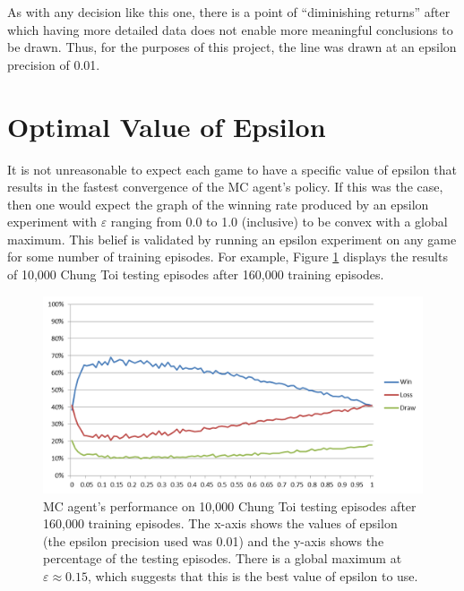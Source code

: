 \documentclass[11pt,a4paper,twoside,openright]{report}
\begin{document}
As with any decision like this one, there is a point of ``diminishing returns'' after which having more detailed data does not enable more meaningful conclusions to be drawn. Thus, for the purposes of this project, the line was drawn at an epsilon precision of 0.01.


\section{Optimal Value of Epsilon}
\label{sec:optimal_epsilon}

It is not unreasonable to expect each game to have a specific value of epsilon that results in the fastest convergence of the MC agent's policy. If this was the case, then one would expect the graph of the winning rate produced by an epsilon experiment with $\varepsilon$ ranging from 0.0 to 1.0 (inclusive) to be convex with a global maximum. This belief is validated by running an epsilon experiment on any game for some number of training episodes. For example, Figure \ref{chung-toi-epsilon-160ktrain-10ktest} displays the results of 10,000 Chung Toi testing episodes after 160,000 training episodes.

\begin{figure}[htbp]
	\begin{center}
		\includegraphics[width=\linewidth]{ChungToi_EpsilonResults_160kTrainingGames_10kTestingGames.png}
		\caption{MC agent's performance on 10,000 Chung Toi testing episodes after 160,000 training episodes. The x-axis shows the values of epsilon (the epsilon precision used was 0.01) and the y-axis shows the percentage of the testing episodes. There is a global maximum at $\varepsilon \approx 0.15$, which suggests that this is the best value of epsilon to use.}
		\label{chung-toi-epsilon-160ktrain-10ktest}
	\end{center}
\end{figure}
\end{document}
